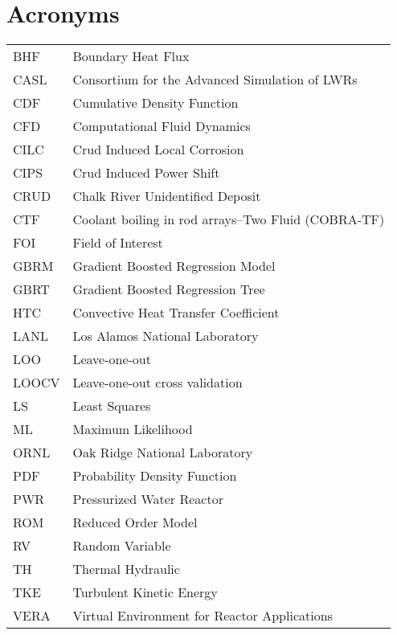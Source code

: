 

\section*{Acronyms}
\begin{tabular}{l l}
BHF & Boundary Heat Flux \\
CASL & Consortium for the Advanced Simulation of LWRs \\
CDF  & Cumulative Density Function \\
CFD &  Computational Fluid Dynamics \\
CILC & Crud Induced Local Corrosion \\
CIPS & Crud Induced Power Shift \\
CRUD & Chalk River Unidentified Deposit \\
CTF &  Coolant boiling in rod arrays–Two Fluid (COBRA-TF) \\
FOI &  Field of Interest \\
GBRM & Gradient Boosted Regression Model \\
GBRT & Gradient Boosted Regression Tree \\
HTC  & Convective Heat Transfer Coefficient \\
LANL & Los Alamos National Laboratory \\
LOO & Leave-one-out \\
LOOCV & Leave-one-out cross validation \\
LS  &  Least Squares \\
ML  &  Maximum Likelihood \\
ORNL & Oak Ridge National Laboratory \\
PDF  &  Probability Density Function \\
PWR  & Pressurized Water Reactor \\
ROM &  Reduced Order Model \\
RV  & Random Variable \\
TH  &  Thermal Hydraulic \\
TKE &  Turbulent Kinetic Energy \\
VERA & Virtual Environment for Reactor Applications \\
\end{tabular}

\pagebreak

